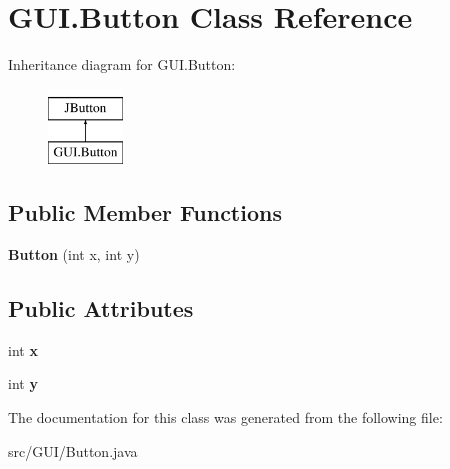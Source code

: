\hypertarget{class_g_u_i_1_1_button}{}\section{G\+U\+I.\+Button Class Reference}
\label{class_g_u_i_1_1_button}
Inheritance diagram for G\+U\+I.\+Button\+:\begin{figure}[H]
\begin{center}
\leavevmode
\includegraphics[height=2.000000cm]{class_g_u_i_1_1_button}
\end{center}
\end{figure}
\subsection*{Public Member Functions}
\begin{DoxyCompactItemize}
\item 
\mbox{\label{class_g_u_i_1_1_button_a2fac288b37b1eb75e10f6f66d5f1f5b1}} 
{\bfseries Button} (int x, int y)
\end{DoxyCompactItemize}
\subsection*{Public Attributes}
\begin{DoxyCompactItemize}
\item 
\mbox{\label{class_g_u_i_1_1_button_a8af19e5ff4096a6a61963d36675a55f2}} 
int {\bfseries x}
\item 
\mbox{\label{class_g_u_i_1_1_button_ae0db1e73886a914b11dcabd2584404dc}} 
int {\bfseries y}
\end{DoxyCompactItemize}


The documentation for this class was generated from the following file\+:\begin{DoxyCompactItemize}
\item 
src/\+G\+U\+I/Button.\+java\end{DoxyCompactItemize}
